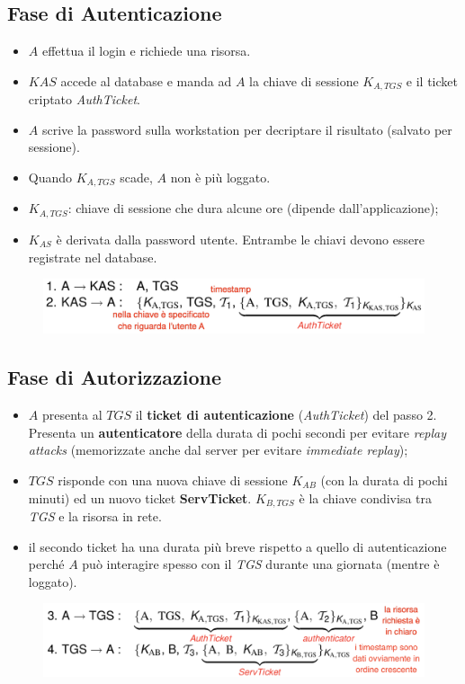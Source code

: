 \documentclass[11pt, a4paper, twoside, italian]{report}
\theoremstyle{plain}
\begin{document}
\subsection*{Fase di Autenticazione}
\begin{multicols}{2}
	\begin{itemize}
		\item $A$ effettua il login e richiede una risorsa.
		\item $KAS$ accede al database e manda ad $A$ la chiave di sessione $K_{A, TGS}$ e il ticket criptato \textit{AuthTicket}.
		\item $A$ scrive la password sulla workstation per decriptare il risultato (salvato per sessione).
	\end{itemize}
\columnbreak
	\begin{itemize}
		\item Quando $K_{A,TGS}$ scade, $A$ non è più loggato.
		\item $K_{A,TGS}$: chiave di sessione che dura alcune ore (dipende dall'applicazione);
		\item $K_{AS}$ è derivata dalla password utente. Entrambe le chiavi devono essere registrate nel database.
	\end{itemize}
\end{multicols}
\begin{figure}[H]
	\centering
	\includegraphics[scale=0.7]{kerbauthphase}
\end{figure}


\subsection*{Fase di Autorizzazione}
\begin{itemize}
	\item $A$ presenta al $TGS$ il \textbf{ticket di autenticazione} (\textit{AuthTicket}) del passo 2. Presenta un \textbf{autenticatore} della durata di pochi secondi per evitare \textit{replay attacks} (memorizzate anche dal server per evitare \textit{immediate replay});
	\item $TGS$ risponde con una nuova chiave di sessione $K_{AB}$ (con la durata di pochi minuti) ed un nuovo ticket \textbf{ServTicket}. $K_{B, TGS}$ è la chiave condivisa tra \textit{TGS} e la risorsa in rete.
	\item il secondo ticket ha una durata più breve rispetto a quello di autenticazione perché $A$ può interagire spesso con il \textit{TGS} durante una giornata (mentre è loggato).
\end{itemize}
\begin{figure}[H]
	\centering
	\includegraphics[scale=0.5]{kerbauthorphase2}
\end{figure}
\end{document}
